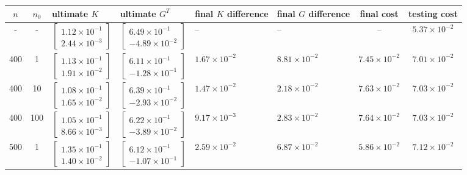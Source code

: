 \documentclass{article}
\begin{document}
\begin{table}[h!]
	\begin{center}
		\begin{tabular}{|c|c|m{3.0cm}|m{3.0cm}|m{1.7cm}|m{1.7cm}|c|c|} 
			\hline
			$n$ & $n_0$ & ultimate $K$ & ultimate $G^T$ & final $K$ difference & final $G$ difference & final cost & testing cost \\ 
			\hline
			- & - & $\begin{bmatrix}1.12\times 10^{-1} \\ 2.44\times 10^{-3}\end{bmatrix}$ & $\begin{bmatrix}6.49\times 10^{-1} \\ -4.89\times 10^{-2}\end{bmatrix}$ & -- & -- & -- & $5.37\times 10^{-2}$\\
			\hline
			\hline
			400 & 1 & $\begin{bmatrix}1.13\times 10^{-1} \\ 1.91\times 10^{-2}\end{bmatrix}$ & $\begin{bmatrix}6.11\times 10^{-1} \\ -1.28\times 10^{-1}\end{bmatrix}$ & $1.67\times 10^{-2}$ & $8.81\times 10^{-2}$ & $7.45\times 10^{-2}$ & $7.01\times 10^{-2}$\\ 
			\hline
			400 & 10 & $\begin{bmatrix}1.08\times 10^{-1} \\ 1.65\times 10^{-2}\end{bmatrix}$ & $\begin{bmatrix}6.39\times 10^{-1} \\ -2.93\times 10^{-2}\end{bmatrix}$ & $1.47\times 10^{-2}$ & $2.18\times 10^{-2}$ & $7.63\times 10^{-2}$ & $7.03\times 10^{-2}$\\ 
			\hline
			400 & 100 & $\begin{bmatrix}1.05\times 10^{-1} \\ 8.66\times 10^{-3}\end{bmatrix}$ & $\begin{bmatrix}6.22\times 10^{-1} \\ -3.89\times 10^{-2}\end{bmatrix}$ & $9.17\times 10^{-3}$ & $2.83\times 10^{-2}$ & $7.64\times 10^{-2}$ & $7.03\times 10^{-2}$\\ 
			\hline
			500 & 1 & $\begin{bmatrix}1.35\times 10^{-1} \\ 1.40\times 10^{-2}\end{bmatrix}$ & $\begin{bmatrix}6.12\times 10^{-1} \\ -1.07\times 10^{-1}\end{bmatrix}$ & $2.59\times 10^{-2}$ & $6.87\times 10^{-2}$ & $5.86\times 10^{-2}$ & $7.12\times 10^{-2}$\\ 

\end{tabular}
\end{center}
\end{table}
\end{document}
